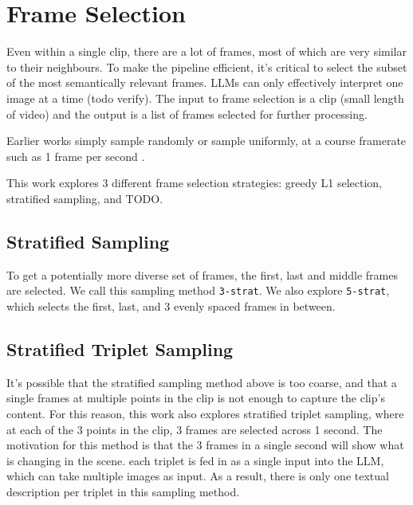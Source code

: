 \documentclass{article}
\begin{document}
\section{Frame Selection}

Even within a single clip, there are a lot of frames, most of which are very similar to their neighbours.
To make the pipeline efficient, it's critical to select the subset of the most semantically relevant frames.
LLMs can only effectively interpret one image at a time (todo verify).
The input to frame selection is a clip (small length of video) and the output is a list of frames selected for further processing.

Earlier works simply sample randomly \cite{TODO} or sample uniformly, at a course framerate such as 1 frame per second \cite{clip4clip}.

This work explores 3 different frame selection strategies:
greedy L1 selection, stratified sampling, and TODO.

\subsection{Stratified Sampling}
To get a potentially more diverse set of frames, the first, last and middle frames are selected.
We call this sampling method \verb|3-strat|. We also explore \verb|5-strat|, which selects the first, last, and 3 evenly spaced frames in between.

\subsection{Stratified Triplet Sampling}
It's possible that the stratified sampling method above is too coarse, and that a single frames at multiple points in the clip is not enough to capture the clip's content.
For this reason, this work also explores stratified triplet sampling, where at each of the 3 points in the clip, 3 frames are selected across 1 second.
The motivation for this method is that the 3 frames in a single second will show what is changing in the scene.
each triplet is fed in as a single input into the LLM, which can take multiple images as input.
As a result, there is only one textual description per triplet in this sampling method.
\end{document}
